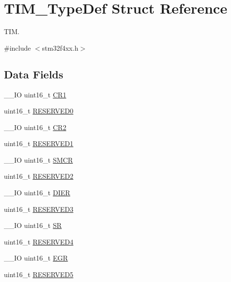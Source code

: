 \hypertarget{struct_t_i_m___type_def}{\section{T\-I\-M\-\_\-\-Type\-Def Struct Reference}
\label{struct_t_i_m___type_def}
}


T\-I\-M.  




{\ttfamily \#include $<$stm32f4xx.\-h$>$}

\subsection*{Data Fields}
\begin{DoxyCompactItemize}
\item 
\-\_\-\-\_\-\-I\-O uint16\-\_\-t \hyperlink{struct_t_i_m___type_def_a61400ce239355b62aa25c95fcc18a5e1}{C\-R1}
\item 
uint16\-\_\-t \hyperlink{struct_t_i_m___type_def_a149feba01f9c4a49570c6d88619f504f}{R\-E\-S\-E\-R\-V\-E\-D0}
\item 
\-\_\-\-\_\-\-I\-O uint16\-\_\-t \hyperlink{struct_t_i_m___type_def_a2a3e81bd118d1bc52d24a0b0772e6a0c}{C\-R2}
\item 
uint16\-\_\-t \hyperlink{struct_t_i_m___type_def_a8249a3955aace28d92109b391311eb30}{R\-E\-S\-E\-R\-V\-E\-D1}
\item 
\-\_\-\-\_\-\-I\-O uint16\-\_\-t \hyperlink{struct_t_i_m___type_def_a02758713abfe580460dd5bcd8762702a}{S\-M\-C\-R}
\item 
uint16\-\_\-t \hyperlink{struct_t_i_m___type_def_a5573848497a716a9947fd87487709feb}{R\-E\-S\-E\-R\-V\-E\-D2}
\item 
\-\_\-\-\_\-\-I\-O uint16\-\_\-t \hyperlink{struct_t_i_m___type_def_a1481b34cc41018c17e4ab592a1c8cb55}{D\-I\-E\-R}
\item 
uint16\-\_\-t \hyperlink{struct_t_i_m___type_def_a6c3b31022e6f59b800e9f5cc2a89d54c}{R\-E\-S\-E\-R\-V\-E\-D3}
\item 
\-\_\-\-\_\-\-I\-O uint16\-\_\-t \hyperlink{struct_t_i_m___type_def_a44962ea5442d203bf4954035d1bfeb9d}{S\-R}
\item 
uint16\-\_\-t \hyperlink{struct_t_i_m___type_def_aa0223808025f5bf9c056185038c9d545}{R\-E\-S\-E\-R\-V\-E\-D4}
\item 
\-\_\-\-\_\-\-I\-O uint16\-\_\-t \hyperlink{struct_t_i_m___type_def_a980df1a5752e36604de4d71ce14fbfa3}{E\-G\-R}
\item 
uint16\-\_\-t \hyperlink{struct_t_i_m___type_def_abd36010ac282682d1f3c641b183b1b6f}{R\-E\-S\-E\-R\-V\-E\-D5}

\end{DoxyCompactItemize}
